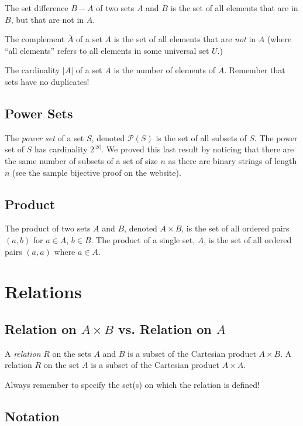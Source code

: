 \documentclass[12pt,letterpaper]{article}
\begin{document}
    The set difference $B - A$ of two sets $A$ and $B$ is the set of all elements that are in $B$, but that are not in $A$.
    
    The complement $\overline{A}$ of a set $A$ is the set of all elements that are \emph{not} in $A$ (where ``all elements'' refers to all elements in some universal set $U$.)
    
    The cardinality $|A|$ of a set $A$ is the number of elements of $A$. Remember that sets have no duplicates!
    
    \subsection{Power Sets}
    The \textit{power set} of a set $S$, denoted $\mathcal{P}(S)$ is the set of all subsets of $S$. The power set of $S$ has cardinality $2^{|S|}$. We proved this last result by noticing that there are the same number of subsets of a set of size $n$ as there are binary strings of length $n$ (see the sample bijective proof on the website).
        
    \subsection{Product}
    The product of two sets $A$ and $B$, denoted $A \times B$, is the set of all ordered pairs $(a,b)$ for $a \in A$, $b \in B$. The product of a single set, $A$, is the set of all ordered pairs $(a,a)$ where $a \in A$.
    
        

\section{Relations}

    \subsection{Relation on $A \times B$ vs. Relation on $A$}
    A \textit{relation} $R$ on the sets $A$ and $B$ is a subset of the Cartesian product $A \times B$. A relation $R$ on the set $A$ is a subset of the Cartesian product $A \times A$. 
    
    Always remember to specify the set(s) on which the relation is defined!
    
    \subsection{Notation}
    
\end{document}
